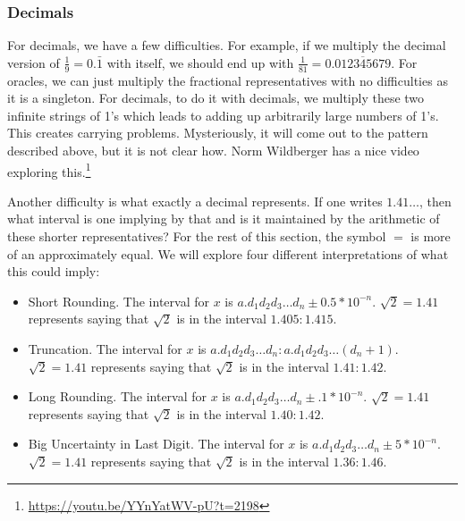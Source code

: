 \documentclass[12pt]{article}
\begin{document}
\subsubsection{Decimals}\label{sec:decimals}

For decimals, we have a few difficulties. For example, if we multiply the decimal version of $\frac{1}{9} = 0.\bar{1}$ with itself, we should end up with $\frac{1}{81} = 0.\overline{012345679}$. For oracles, we can just multiply the fractional representatives with no difficulties as it is a singleton. For decimals, to do it with decimals, we multiply these two infinite strings of 1's which leads to adding up arbitrarily large numbers of 1's. This creates carrying problems. Mysteriously, it will come out to the pattern described above, but it is not clear how. Norm Wildberger has a nice video exploring this.\footnote{\url{https://youtu.be/YYnYatWV-pU?t=2198}}

Another difficulty is what exactly a decimal represents. If one writes $1.41\ldots$, then what interval is one implying by that and is it maintained by the arithmetic of these shorter representatives? For the rest of this section, the symbol $=$ is more of an approximately equal. We will explore four different interpretations of what this could imply:

\begin{itemize}
\item Short Rounding. The interval for $x$ is $a.d_1d_2d_3\ldots d_n \pm 0.5*10^{-n}$. $\sqrt{2} = 1.41$ represents saying that $\sqrt{2}$ is in the interval $1.405:1.415$.
\item Truncation. The interval for $x$ is $a.d_1d_2d_3\ldots d_n: a.d_1d_2d_3\ldots (d_n+1)$. $\sqrt{2} = 1.41$ represents saying that $\sqrt{2}$ is in the interval $1.41:1.42$. 
\item Long Rounding. The interval for $x$ is $a.d_1d_2d_3\ldots d_n \pm .1*10^{-n}$. $\sqrt{2} = 1.41$ represents saying that $\sqrt{2}$ is in the interval $1.40:1.42$.
\item Big Uncertainty in Last Digit. The interval for $x$ is $a.d_1d_2d_3\ldots d_n \pm 5*10^{-n}$. $\sqrt{2} = 1.41$ represents saying that $\sqrt{2}$ is in the interval $1.36:1.46$. 
\end{itemize}
\end{document}
